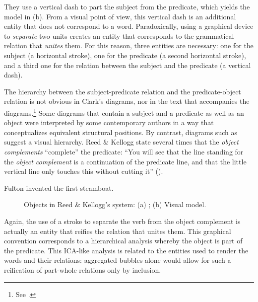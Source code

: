 \documentclass[output=paper]{langsci/langscibook}
\begin{document}
They use a vertical dash to part the subject from the predicate, which yields the model in (b). From a visual point of view, this vertical dash is an additional entity that does not correspond to a word. Paradoxically, using a graphical device to \textit{separate} two units creates an entity that corresponds to the grammatical relation that \textit{unites} them. For this reason, three entities are necessary: one for the subject (a horizontal stroke), one for the predicate (a second horizontal stroke), and a third one for the relation between the subject and the predicate (a vertical dash).

The hierarchy between the subject-predicate relation and the predicate-object relation is not obvious in Clark’s diagrams, nor in the text that accompanies the diagrams.\footnote{ \textrm{See \citet[§4.3.2]{imrenyi_how_2020}.}} Some diagrams that contain a subject and a predicate as well as an object were interpreted by some contemporary authors \citep[30]{jewell_grammatical_1867} in a way that conceptualizes equivalent structural positions. By contrast, diagrams such as  suggest a visual hierarchy. Reed \& Kellogg state several times that the \textit{object complements} “complete” the predicate: “You will see that the line standing for the \textit{object complement} is a continuation of the predicate line, and that the little vertical line only touches this without cutting it” (\citealt[54]{reed_graded_1879}).

\ea \label{ex:4:3} Fulton invented the first steamboat.\z

 \begin{figure}
     \caption{Objects in Reed \& Kellogg’s system: (a) \citeyear[53]{reed_graded_1879}; (b) Visual model.\label{fig:4:6}}
 \end{figure}


Again, the use of a stroke to separate the verb from the object complement is actually an entity that reifies the relation that unites them. This graphical convention corresponds to a hierarchical analysis whereby the object is part of the predicate. This ICA-like analysis is related to the entities used to render the words and their relations: aggregated bubbles alone would allow for such a reification of part-whole relations only by inclusion.
\end{document}
